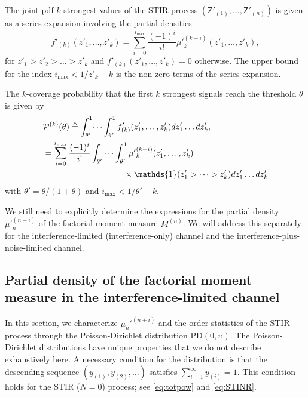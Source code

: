 \documentclass[lettersize,journal]{IEEEtran}
\begin{document}
The joint pdf $k$ strongest values of the STIR process $(\mathsf{Z}'_{(1)}, \dots, \mathsf{Z}'_{(n)})$ is given as a series expansion involving the partial densities
\begin{equation}
  \label{eq:jointprobability}
  f'_{(k)}(z'_1,\dots,z'_k)= \sum^{i_{\text{max}}}_{i=0}\frac{(-1)^i}{i!}{\mu'}_k^{(k+i)}(z'_1,\dots,z'_k),
\end{equation}
for $z'_1>z'_2>\dots>z'_k$ and $f'_{(k)}(z'_1,\dots,z'_k) =0 $ otherwise. The upper bound for the index $i_{\text{max}}<1/z'_k-k$ is the non-zero terms of the series expansion. 

The $k$-coverage probability that the first $k$ strongest signals reach the threshold $\theta$ is given by
\begin{align}
  \label{eq:kprobability}
  &\mathcal{P}^{(k)}(\theta) \triangleq  \int_{\theta'}^1\dots \int_{\theta'}^1 f'_{(k)}({z'_1},\dots,{z'_k})dz'_1 \dots d{z'_k}, \nonumber\\
  &=\sum_{i=0}^{i_{\text{max}}}\frac{(-1)^i}{i!}\int_{\theta'}^1\dots \int_{\theta'}^1 {\mu'}_k^{(k+i)}(z'_1,\dots,z'_k) \nonumber\\
  &\hspace{3.4cm}\times\mathds{1}(z'_1>\dots>z'_k) dz'_1 \dots d{z'_k}
\end{align}
with $\theta'=\theta/(1+\theta)$ and $i_{\text{max}}<1/\theta'-k$.

We still need to explicitly determine the expressions for the partial density ${\mu'}_n^{(n+i)}$ of the factorial moment measure $M^{(n)}$. We will address this separately for the interference-limited (interference-only) channel and the interference-plus-noise-limited channel.


\subsection{Partial density of the factorial moment measure in the interference-limited channel}

\label{sec:partialdensitySIR}


In this section, we characterize $\mu_n'^{(n+i)}$ and the order statistics of the STIR process through the Poisson-Dirichlet distribution $\text{PD}(0, \upsilon_{})$. The Poisson-Dirichlet distributions have unique properties that we do not describe exhaustively here. A necessary condition for the distribution is that the descending sequence $(y_{(1)}, y_{(2)}, \dots)$ satisfies $\sum_{i=1}^{\infty} y_{(i)} = 1$. This condition holds for the STIR ($N=0$) process; see \eqref{eq:totpow} and \eqref{eq:STINR}. 
\end{document}
